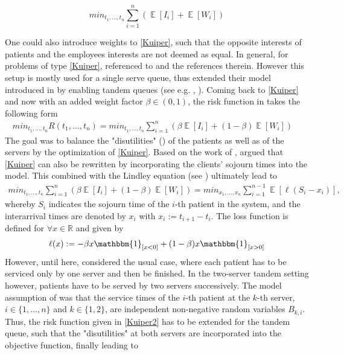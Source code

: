 \documentclass[11pt,a4paper]{article}
\DeclareMathOperator{\EX}{\mathbb{E}}%
\begin{document}
\begin{spacing}{1.8}
\begin{equation} \label{Kuiper} min_{t_1,\dots,t_n} \sum_{i=1}^{n} \left( \EX \left[I_i\right] + \EX \left[W_i\right] \right) \end{equation}



One could also introduce weights to \eqref{Kuiper}, such that the opposite interests of patients and the employees interests are not deemed as equal. In general, for problems of type \eqref{Kuiper}, \citet{Kuiper2015} referenced to \citep{CAYIRLI2009} and the references therein. However this setup is mostly used for a single serve queue, thus \citet{Kuiper2015} extended their model introduced in \citep{Kuiper2014} by enabling tandem queues (see e.g. \citep{Boxma1979}, \citep{Pinedo1982}). Coming back to \eqref{Kuiper} and now with an added weight factor \(\beta \in \left(0,1\right)\), the risk function in \citep{Kuiper2015} takes the following form
\begin{align} \label{Kuiper2} min_{t_1,\dots,t_n} R(t_1, \dots, t_n) = min_{t_1,\dots,t_n} \sum_{i=1}^{n} \left(\beta \EX \left[I_i\right] + (1-\beta) \EX \left[W_i\right] \right) \quad   \end{align}
The goal was to balance  the "disutilities" (\citep{Kuiper2014}) of the patients as well as of the servers by the optimization of \eqref{Kuiper}. Based on the work of \citep{Kemper2014},  \citet{Kuiper2015} argued that \eqref{Kuiper} can also be rewritten by incorporating the clients' sojourn times into the model. This combined with the Lindley equation (see \citep{Lindley1952}) ultimately lead to
\begin{align} \label{Kuiper2}
min_{t_1,\dots,t_n} \sum_{i=1}^{n} \left(\beta \EX \left[I_i\right] + (1-\beta) \EX \left[W_i\right] \right) = min_{x_1,\dots,x_n} \sum_{i=1}^{n-1} \EX \left[ \ell (S_i-x_i)
\right], \end{align}
whereby \(S_i\) indicates the sojourn time of the \(i\)-th patient in the system, and the interarrival times are denoted by \(x_i\) with \(x_i := t_{i+1}-t_i\). The loss function is defined for \(\forall x \in \mathbb{R}\) and given by
\begin{align} \ell(x):= -\beta x \mathbbm{1}_{\left[x < 0 \right]} + (1-\beta) x \mathbbm{1}_{\left[x > 0\right]} \end{align}
However, until here, \citet{Kuiper2015} considered the usual case, where each patient has to be serviced only by one server and then be finished. In the two-server tandem setting however,  patients have to be  served by two servers successively. The model assumption of \citet{Kuiper2015} was that  the service times 
of the \(i\)-th patient at the \(k\)-th server, \(i \in \{1,\dots,n \}\) and \(k \in \{1,2\}\), are independent non-negative random variables \(B_{k,i}\). Thus, the risk function given in \eqref{Kuiper2} has to be extended for the tandem queue, such that the "disutilities" at both servers are incorporated into the objective function, finally leading to


\end{spacing}
\end{document}
